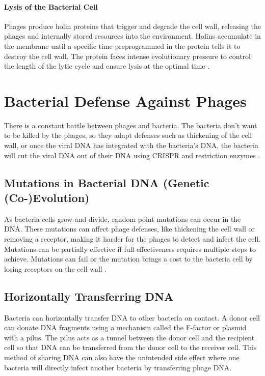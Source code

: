 \paragraph{Lysis of the Bacterial Cell}
Phages produce holin proteins that trigger and degrade the cell wall, releasing the phages and internally stored resources into the environment. 
Holins accumulate in the membrane until a specific time preprogrammed in the protein tells it to destroy the cell wall. 
The protein faces intense evolutionary pressure to control the length of the lytic cycle and ensure lysis at the optimal time \cite{wangHolinsProteinClocks2000}. 

\section{Bacterial Defense Against Phages} 
There is a constant battle between phages and bacteria. 
The bacteria don't want to be killed by the phages, so they adapt defenses such as thickening of the cell wall, or once the viral DNA has integrated with the bacteria's DNA, the bacteria will cut the viral DNA out of their DNA using CRISPR and restriction enzymes \cite{iglerPhenotypicFluxRole2022}. 

\subsection{Mutations in Bacterial DNA (Genetic (Co-)Evolution)}
As bacteria cells grow and divide, random point mutations can occur in the DNA. 
These mutations can affect phage defenses, like thickening the cell wall or removing a receptor, making it harder for the phages to detect and infect the cell. 
Mutations can be partially effective if full effectiveness requires multiple steps to achieve. 
Mutations can fail or the mutation brings a cost to the bacteria cell by losing receptors on the cell wall \cite{lenskiTWOSTEPRESISTANCEESCHERICHIA1984} . 

\subsection{Horizontally Transferring DNA}
Bacteria can horizontally transfer DNA to other bacteria on contact. 
A donor cell can donate DNA fragments using a mechanism called the F-factor or plasmid with a pilus. 
The pilus acts as a tunnel between the donor cell and the recipient cell so that DNA can be transferred from the donor cell to the receiver cell. 
This method of sharing DNA can also have the unintended side effect where one bacteria will directly infect another bacteria by transferring phage DNA. 

